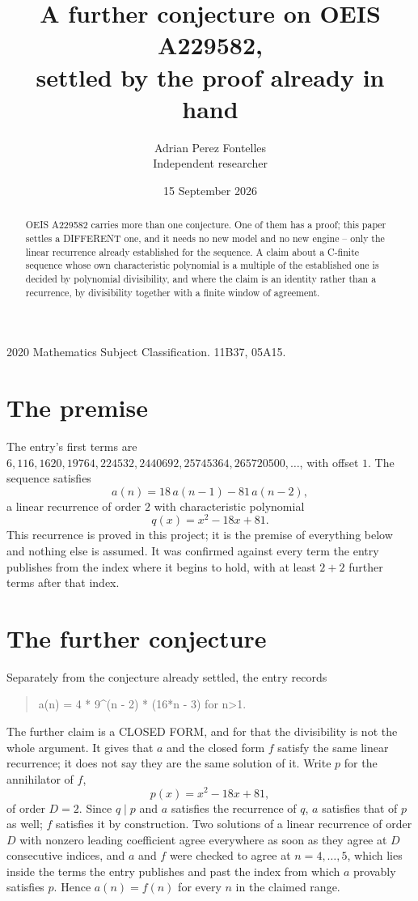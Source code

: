 \documentclass[11pt,a4paper]{article}
\title{A further conjecture on OEIS A229582,\\ \large settled by the proof already in hand}
\author{Adrian Perez Fontelles\\ \small Independent researcher}
\date{15 September 2026}
\theoremstyle{plain}
\theoremstyle{definition}
\begin{document}
\maketitle

\begin{abstract}
OEIS A229582 carries more than one conjecture. One of them has a proof; this paper settles a
DIFFERENT one, and it needs no new model and no new engine -- only the linear recurrence already
established for the sequence. A claim about a C-finite sequence whose own characteristic
polynomial is a multiple of the established one is decided by polynomial divisibility, and where
the claim is an identity rather than a recurrence, by divisibility together with a finite window
of agreement.
\end{abstract}

\noindent\small 2020 Mathematics Subject Classification. 11B37, 05A15.\normalsize

\section{The premise}

The entry's first terms are $6, 116, 1620, 19764, 224532, 2440692, 25745364, 265720500,\dots$, with offset $1$. The sequence satisfies
\[
  a(n)=18\,a(n-1) - 81\,a(n-2) ,
\]
a linear recurrence of order $2$ with characteristic polynomial
\[
  q(x)=x^{2} - 18 x + 81 .
\]
This recurrence is proved in this project; it is the premise of everything below and nothing else is assumed.
It was confirmed against every term the entry publishes from the index where it begins to hold,
with at least $2+2$ further terms after that index.

\section{The further conjecture}

Separately from the conjecture already settled, the entry records

\begin{quote}\raggedright a(n) = 4 * 9\^{}(n - 2) * (16*n - 3) for n>1.\end{quote}

The further claim is a CLOSED FORM, and for that the divisibility is not the whole argument. It
gives that $a$ and the closed form $f$ satisfy the same linear recurrence; it does not say they
are the same solution of it. Write $p$ for the annihilator of $f$,
\[
  p(x)=x^{2} - 18 x + 81 ,
\]
of order $D=2$. Since $q\mid p$ and $a$ satisfies the recurrence of $q$, $a$ satisfies that of
$p$ as well; $f$ satisfies it by construction. Two solutions of a linear recurrence of order $D$
with nonzero leading coefficient agree everywhere as soon as they agree at $D$ consecutive
indices, and $a$ and $f$ were checked to agree at $n=4,\dots,5$,
which lies inside the terms the entry publishes and past the index from which $a$ provably
satisfies $p$. Hence $a(n)=f(n)$ for every $n$ in the claimed range.
\end{document}
